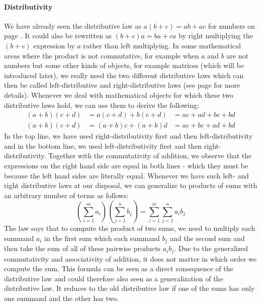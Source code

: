 \paragraph{Distributivity}
We have already seen the distributive law as $a (b + c) = a b + a c$ for numbers on page \pageref{Sec:ArithmeticLaws}. It could also be rewritten as $(b + c) a = b a + c a$ by right multiplying the $(b+c)$ expression by $a$ rather than left multiplying. In some mathematical areas where the product is not commutative, for example when $a$ and $b$ are not numbers but some other kinds of objects, for example matrices (which will be introduced later), we really need the two different distributive laws which can then be called left-distributive and right-distributive laws (see page \pageref{Sec:RingTheory} for more details). Whenever we deal with mathematical objects for which these two distributive laws hold, we can use them to derive the following:
\begin{eqnarray}
(a+b)(c+d) &= a(c+d) + b(c+d) &= ac + ad + bc + bd \\
(a+b)(c+d) &= (a+b)c + (a+b)d &= ac + bc + ad + bd 
\end{eqnarray}
In the top line, we have used right-distributivity first and then left-distributivity and in the bottom line, we used left-distributivity first and then right-distributivity. Together with the commutativity of addition, we observe that the expressions on the right hand side are equal in both lines - which they must be because the left hand sides are literally equal. Whenever we have such left- and right distributive laws at our disposal, we can generalize to products of sums with an arbitrary number of terms as follows:
\begin{equation}
\left(\sum_{i=1}^{m} a_i \right) \left(\sum_{j=1}^{n} b_j \right) =
\sum_{i=1}^{m} \sum_{j=1}^{n} a_i b_j
\end{equation}
The law says that to compute the product of two sums, we need to multiply each summand $a_i$ in the first sum which each summand $b_j$ and the second sum and then take the sum of all of these pairwise products $a_i b_j$. Due to the generalized commutativity and associativity of addition, it does not matter in which order we compute the sum. This formula can be seen as a direct consequence of the distributive law and could therefore also seen as a generalization of the distributive law. It reduces to the old distributive law if one of the sums has only one summand and the other has two.

